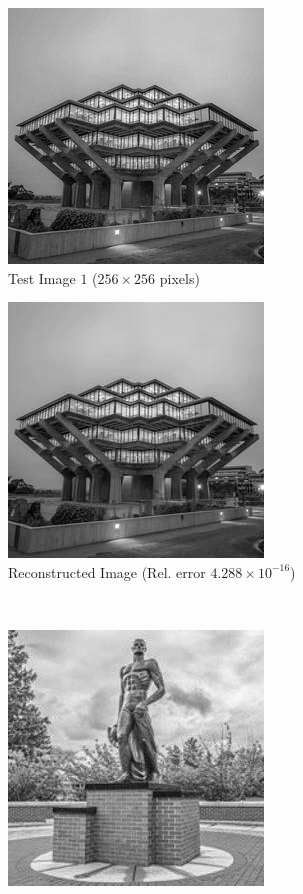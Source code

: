 %
\begin{figure}[p]
    \centering
    \begin{subfigure}[b]{0.495\textwidth}
        \centering
        \includegraphics[scale=0.75]{true_ucsd}
        \caption{Test Image $1$ ($256\times 256$ pixels)}
        \label{fig:true}
    \end{subfigure}
    \hfill
    \begin{subfigure}[b]{0.495\textwidth}
        \centering
        \includegraphics[scale=0.75]{recon_ucsd}
        \caption{Reconstructed Image (Rel. error $4.288\times 10^{-16}$)}
        \label{fig:recon}
    \end{subfigure}
    \vspace{0.05in} \\
    \begin{subfigure}[b]{0.495\textwidth}
        \centering
        \includegraphics[scale=0.75]{true}

\end{subfigure}
\end{figure}
